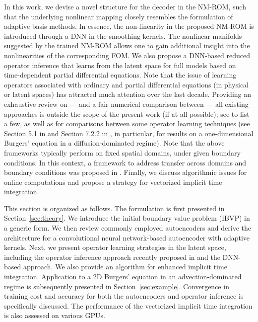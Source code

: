 In this work, we devise a novel structure for the decoder in the NM-ROM, such that the underlying nonlinear mapping closely resembles the formulation of adaptive basis methods. In essence, the non-linearity in the proposed NM-ROM is introduced through a DNN in the smoothing kernels. The nonlinear manifolds suggested by the trained NM-ROM allows one to gain additional insight into the nonlinearities of the corresponding FOM. We also propose a DNN-based reduced operator inference that learns from the latent space for full models based on time-dependent partial differential equations. Note that the issue of learning operators associated with ordinary and partial differential equations (in physical or latent spaces) has attracted much attention over the last decade. Providing an exhaustive review on --- and a fair numerical comparison between --- all existing approaches is outside the scope of the present work (if at all possible); see \cite{lu2021learning,li2020fourier, li2022fourier,wen2022u,lu2021deepxde,pang2019fpinns,zhang2019quantifying,li2020multipole,li2020neural,tran2021factorized,guibas2021adaptive,tripura2022wavelet,gupta2021multiwavelet,kovachki2021neural,jin2022mionet,li2021physics,raonic2023convolutional,batlle2023kernel} to list a few, as well as \cite{LU2022114778,kovachki2023neural} for comparisons between some operator learning techniques (see Section 5.1 in \cite{LU2022114778} and Section 7.2.2 in \cite{kovachki2023neural}, in particular, for results on a one-dimensional Burgers' equation in a diffusion-dominated regime). Note that the above frameworks typically perform on fixed spatial domains, under given boundary conditions. In this context, a framework to address transfer across domains and boundary conditions was proposed in \cite{WANG2022114424}. Finally, we discuss algorithmic issues for online computations and propose a strategy for vectorized implicit time integration. 

This section is organized as follows. The formulation is first presented in Section~\ref{sec:theory}. We introduce the initial boundary value problem (IBVP) in a generic form. We then review commonly employed autoencoders and derive the architecture for a convolutional neural network-based autoencoder with adaptive kernels. Next, we present operator learning strategies in the latent space, including the operator inference approach recently proposed in \cite{qian2022reduced} and the DNN-based approach. We also provide an algorithm for enhanced implicit time integration. Application to a 2D Burgers' equation in an advection-dominated regime is subsequently presented in Section~\ref{sec:example}. Convergence in training cost and accuracy for both the autoencoders and operator inference is specifically discussed. The performance of the vectorized implicit time integration is also assessed on various GPUs.

